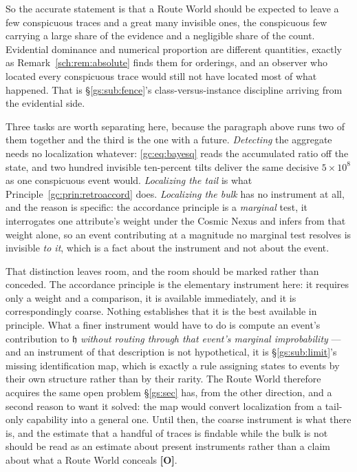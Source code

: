 \documentclass[11pt]{article}
\numberwithin{equation}{section}
\theoremstyle{plain}
\theoremstyle{definition}
\theoremstyle{remark}
\newcommand{\hm}{\mathfrak{h}}
\begin{document}
So the accurate statement is that a Route World should be expected to leave
a few conspicuous traces and a great many invisible ones, the conspicuous
few carrying a large share of the evidence and a negligible share of the
count. Evidential dominance and numerical proportion are different
quantities, exactly as Remark~\ref{sch:rem:absolute} finds them for
orderings, and an observer who located every conspicuous trace would
still not have located most of what happened. That is
\S\ref{gs:sub:fence}'s class-versus-instance discipline arriving from the
evidential side.

Three tasks are worth separating here, because the paragraph above runs
two of them together and the third is the one with a future.
\emph{Detecting} the aggregate needs no localization whatever:
\eqref{gc:eq:bayesq} reads the accumulated ratio off the state, and two
hundred invisible ten-percent tilts deliver the same decisive
$5\times10^{8}$ as one conspicuous event would. \emph{Localizing the
tail} is what Principle~\ref{gc:prin:retroaccord} does. \emph{Localizing
the bulk} has no instrument at all, and the reason is specific: the
accordance principle is a \emph{marginal} test, it interrogates one
attribute's weight under the Cosmic Nexus and infers from that weight
alone, so an event contributing at a magnitude no marginal test
resolves is invisible \emph{to it}, which is a fact about the instrument
and not about the event.

That distinction leaves room, and the room should be marked rather than
conceded. The accordance principle is the elementary instrument here: it
requires only a weight and a comparison, it is available immediately, and
it is correspondingly coarse. Nothing establishes that it is the best
available in principle. What a finer instrument would have to do is
compute an event's contribution to $\hm$ \emph{without routing through
that event's marginal improbability} --- and an instrument of that
description is not hypothetical, it is
\S\ref{gs:sub:limit}'s missing identification map, which is exactly a
rule assigning states to events by their own structure rather than by
their rarity. The Route World therefore acquires the same open problem
\S\ref{gs:sec} has, from the other direction, and a second reason to want
it solved: the map would convert localization from a tail-only
capability into a general one. Until then, the coarse instrument is what
there is, and the estimate that a handful of traces is findable while the
bulk is not should be read as an estimate about present instruments
rather than a claim about what a Route World conceals \textbf{[O]}.
\end{document}
